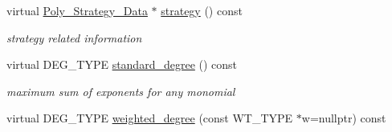 \begin{Indent}
\begin{DoxyCompactItemize}
\mbox{\label{group__polygroup_a3b7b27fc293408d0d34d60dc6a090c79}} 
virtual \hyperlink{group__strategygroup_class_poly___strategy___data}{Poly\+\_\+\+Strategy\+\_\+\+Data} $\ast$ \hyperlink{group__polygroup_a3b7b27fc293408d0d34d60dc6a090c79}{strategy} () const
\begin{DoxyCompactList}\small\item\em strategy related information \end{DoxyCompactList}\item 
\mbox{\label{group__polygroup_aa619f56a2df5d0077335709ac11de039}} 
virtual D\+E\+G\+\_\+\+T\+Y\+PE \hyperlink{group__polygroup_aa619f56a2df5d0077335709ac11de039}{standard\+\_\+degree} () const
\begin{DoxyCompactList}\small\item\em maximum sum of exponents for any monomial \end{DoxyCompactList}\item 
virtual D\+E\+G\+\_\+\+T\+Y\+PE \hyperlink{group__polygroup_a231aa84c74183943142952d8035b1943}{weighted\+\_\+degree} (const W\+T\+\_\+\+T\+Y\+PE $\ast$w=nullptr) const
\end{DoxyCompactItemize}
\end{Indent}
